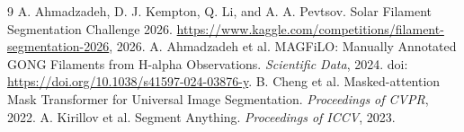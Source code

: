 \documentclass[sigconf]{acmart}
\begin{document}
\begin{thebibliography}{9}
 A. Ahmadzadeh, D. J. Kempton, Q. Li, and A. A. Pevtsov. Solar Filament Segmentation Challenge 2026. \url{https://www.kaggle.com/competitions/filament-segmentation-2026}, 2026.
 A. Ahmadzadeh et al. MAGFiLO: Manually Annotated GONG Filaments from H-alpha Observations. \textit{Scientific Data}, 2024. doi: \url{https://doi.org/10.1038/s41597-024-03876-y}.
 B. Cheng et al. Masked-attention Mask Transformer for Universal Image Segmentation. \textit{Proceedings of CVPR}, 2022.
 A. Kirillov et al. Segment Anything. \textit{Proceedings of ICCV}, 2023.
\end{thebibliography}
\end{document}
